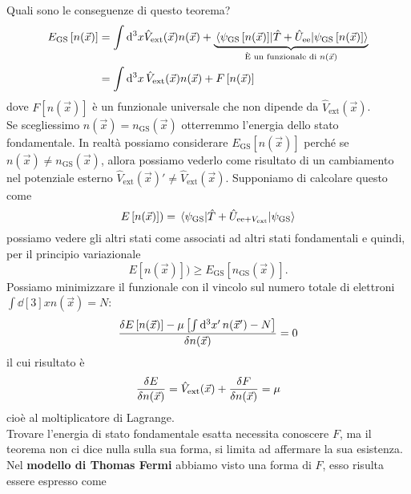 \noindent Quali sono le conseguenze di questo teorema?
\begin{equation*}
    \begin{aligned}
        E_{\text{GS}}\left[n(\vec{x})\right] &=\int \dd[3]x \hat V_{\text{ext}}(\vec x)n(\vec x)+\underbrace{\mel{\psi_{\text{GS}}\left[n(\vec{x})\right]}{\hat T + \hat U_{\text{ee}}}{\psi_{\text{GS}}\left[n(\vec{x})\right]}}_{\text{È un funzionale di } n(\vec x)} \\
        &= \int \dd[3]{x}\hat V_{\text{ext}}(\vec x)n(\vec x)+F\left[n(\vec x)\right]
    \end{aligned}
\end{equation*}
dove $F\left[n(\vec x)\right]$ è un funzionale universale che non dipende da $\hat V_{\text{ext}}(\vec x)$. \\
Se scegliessimo $n(\vec x)=n_{\text{GS}}(\vec x)$ otterremmo l'energia dello stato fondamentale. In realtà possiamo considerare $E_{\text{GS}}\left[n(\vec{x})\right]$ perché se $n(\vec x)\neq n_{\text{GS}}(\vec x)$, allora possiamo vederlo come risultato di un cambiamento nel potenziale esterno $\hat V_{\text{ext}}(\vec x)'\neq \hat V_{\text{ext}}(\vec x)$. Supponiamo di calcolare questo come
\begin{equation*}
    E\left[n(\vec x)\right])= \mel{\psi_{\text{GS}}}{\hat T + \hat U_{\text{ee}+V_{\text{ext}}}}{\psi_{\text{GS}}}
\end{equation*}
possiamo vedere gli altri stati come associati ad altri stati fondamentali e quindi, per il principio variazionale
\begin{equation*}
    E\left[n(\vec x)\right]) \geq E_{\text{GS}}\left[n_\text{GS}(\vec{x})\right].
\end{equation*}
Possiamo minimizzare il funzionale con il vincolo sul numero totale di elettroni $\int \dd[3]{x}n(\vec x)=N$:
\begin{equation*}
    \functionalderivative{E\left[n(\vec x)\right]-\mu\left[\int \dd[3]{x'}n(\vec x')- N\right]}{n(\vec x)}=0
\end{equation*}
il cui risultato è
\begin{equation*}
    \functionalderivative{E}{n(\vec x)}=\hat V_{\text{ext}}(\vec x)+\functionalderivative{F}{n(\vec x)}=\mu
\end{equation*}
cioè al moltiplicatore di Lagrange.\\
Trovare l'energia di stato fondamentale esatta necessita conoscere $F$, ma il teorema non ci dice nulla sulla sua forma, si limita ad affermare la sua esistenza. Nel \textbf{modello di Thomas Fermi} abbiamo visto una forma di $F$, esso risulta essere espresso come
